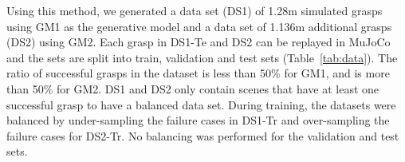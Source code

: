 Using this method, we generated a data set (DS1) of 1.28m simulated grasps using GM1 as the generative model and a data set of 1.136m additional grasps (DS2) using GM2. Each grasp in DS1-Te and DS2 can be replayed in MuJoCo and the sets are split into train, validation and test sets (Table~\ref{tab:data}). The ratio of successful grasps in the dataset is less than 50\% for GM1, and is more than 50\% for GM2. DS1 and DS2 only contain scenes that have at least one successful grasp to have a balanced data set. During training, the datasets were balanced by under-sampling the failure cases in DS1-Tr and over-sampling the failure cases for DS2-Tr. No balancing was performed for the validation and test sets.
\begin{table}[t]
\centering
\caption{Statistics of the simulated data sets.}
\label{tab:data}
\end{table}


